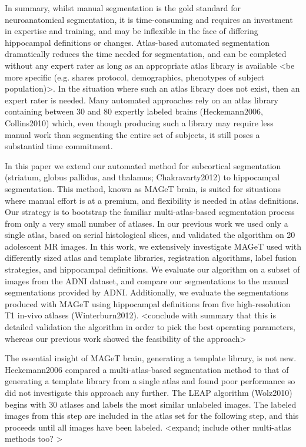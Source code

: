 \documentclass{article}\usepackage{graphicx, color}
\begin{document}
In summary, whilst manual segmentation is the gold standard for neuroanatomical segmentation, it is time-consuming and requires an investment in expertise and training, and may be inflexible in the face of differing hippocampal definitions or changes. Atlas-based automated segmentation dramatically reduces the time needed for segmentation, and can be completed without any expert rater as long as an appropriate atlas library is available <be more specific (e.g. shares protocol, demographics, phenotypes of subject population)>.  In the situation where such an atlas library does not exist, then an expert rater is needed. Many automated approaches rely on an atlas library containing between 30 and 80 expertly labeled brains (Heckemann2006, Collins2010) which, even though producing such a library may require less manual work than segmenting the entire set of subjects, it still poses a substantial time commitment.  

In this paper we extend our automated method for subcortical segmentation (striatum, globus pallidus, and thalamus; Chakravarty2012) to hippocampal segmentation. This method, known as MAGeT brain, is suited for situations where manual effort is at a premium, and flexibility is needed in atlas definitions.  Our strategy is to bootstrap the familiar multi-atlas-based segmentation process from only a very small number of atlases.  In our previous work we used only a single atlas, based on serial histological slices, and validated the algorithm on 20 adolescent MR images.  In this work, we extensively investigate MAGeT used with differently sized atlas and template libraries, registration algorithms, label fusion strategies, and hippocampal definitions.  We evaluate our algorithm on a subset of images from the ADNI dataset, and compare our segmentations to the manual segmentations provided by ADNI.  Additionally, we evaluate the segmentations produced with MAGeT using hippocampal definitions from five high-resolution T1 in-vivo atlases (Winterburn2012). <conclude with summary that this is detailed validation the algorithm in order to pick the best operating parameters, whereas our previous work showed the feasibility of the approach> 

The essential insight of MAGeT brain, generating a template library, is not new. Heckemann2006 compared a multi-atlas-based segmentation method to that of generating a template library from a single atlas and found poor performance so did not investigate this approach any further. The LEAP algorithm (Wolz2010) begins with 30 atlases and labels the most similar unlabeled images. The labeled images from this step are included in the atlas set for the following step, and this proceeds until all images have been labeled. <expand; include other multi-atlas methods too? >
\end{document}
